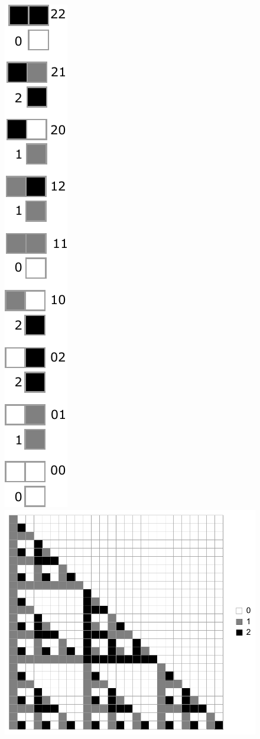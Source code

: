 \documentclass{beamer}
\begin{document}
\begin{frame}
    \begin{figure}
        \centering
        \includegraphics[scale=0.5]{genPolyRuleVertical.pdf}
        \includegraphics[scale=0.6]{Mod3Bigger.pdf}

\end{figure}
\end{frame}
\end{document}
